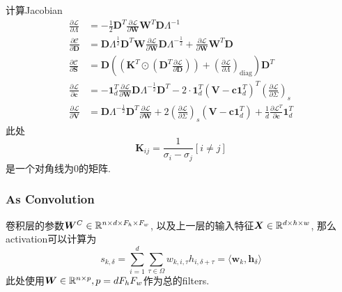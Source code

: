 \documentclass{article}
\begin{document}
计算Jacobian
\begin{equation}
    \begin{aligned}
    \frac{\partial \mathcal{L}}{\partial \Lambda} &=-\frac{1}{2} \mathbf{D}^{T} \frac{\partial \mathcal{L}}{\partial \mathbf{W}} \mathbf{W}^{T} \mathbf{D} \Lambda^{-1} \\
    \frac{\partial \mathcal{C}}{\partial \mathbf{D}} &=\mathbf{D} \Lambda^{\frac{1}{2}} \mathbf{D}^{T} \mathbf{W} \frac{\partial \mathcal{L}}{\partial \mathbf{W}} \mathbf{D} \Lambda^{-\frac{1}{2}}+\frac{\partial \mathcal{L}}{\partial \mathbf{W}} \mathbf{W}^{T} \mathbf{D} \\
    \frac{\partial \mathcal{C}}{\partial \mathbf{S}} &=\mathbf{D}\left(\left(\mathbf{K}^{T} \odot\left(\mathbf{D}^{T} \frac{\partial \mathcal{L}}{\partial \mathbf{D}}\right)\right)+\left(\frac{\partial \mathcal{L}}{\partial \Lambda}\right)_{\operatorname{diag}}\right) \mathbf{D}^{T} \\
    \frac{\partial \mathcal{L}}{\partial \mathbf{c}} &=-\mathbf{1}_{d}^{T} \frac{\partial \mathcal{L}}{\partial \mathbf{W}} \mathbf{D} \Lambda^{-\frac{1}{2}} \mathbf{D}^{T}-2 \cdot \mathbf{1}_{d}^{T}\left(\mathbf{V}-\mathbf{c} \mathbf{1}_{d}^{T}\right)^{T}\left(\frac{\partial \mathcal{L}}{\partial \Sigma}\right)_{s} \\
    \frac{\partial \mathcal{L}}{\partial \mathbf{V}} &=\mathbf{D} \Lambda^{-\frac{1}{2}} \mathbf{D}^{T} \frac{\partial \mathcal{L}}{\partial \mathbf{W}}+2\left(\frac{\partial \mathcal{L}}{\partial \Sigma}\right)_{s}\left(\mathbf{V}-\mathbf{c} \mathbf{1}_{d}^{T}\right)+\frac{1}{d} \frac{\partial \mathcal{L}^{T}}{\partial \mathbf{c}} \mathbf{1}_{d}^{T}
    \end{aligned}
\end{equation}
此处
\begin{equation}
    \mathbf{K}_{i j}=\frac{1}{\sigma_{i}-\sigma_{j}}[i \neq j]
\end{equation}是一个对角线为0的矩阵.

\subsubsection{As Convolution}

\flushleft
卷积层的参数$\boldsymbol{W}^C\in \mathbb{R}^{n\times d\times F_h\times F_w}$, 以及上一层的输入特征$\boldsymbol{X}\in \mathbb{R}^{d\times h\times w}$, 那么activation可以计算为
\begin{equation}
    s_{k, \delta}=\sum_{i=1}^{d} \sum_{\tau \in \Omega} w_{k, i, \tau} h_{i, \delta+\tau}=\langle\mathbf{w}_{k}, \mathbf{h}_{\delta}\rangle
\end{equation}
此处使用$\boldsymbol{W}\in \mathbb{R}^{n\times p},p=d F_h F_w$作为总的filters.
\end{document}

